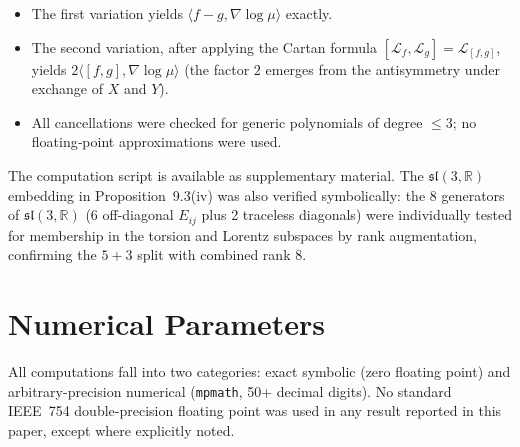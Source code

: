 \documentclass[12pt,a4paper]{article}
\theoremstyle{plain}
\theoremstyle{definition}
\theoremstyle{remark}
\begin{document}
\begin{itemize}
  \item The first variation yields $\langle f-g,\nabla\log\mu\rangle$ exactly.
  \item The second variation, after applying the Cartan formula
    $[\mathcal{L}_f,\mathcal{L}_g]=\mathcal{L}_{[f,g]}$, yields
    $2\langle [f,g],\nabla\log\mu\rangle$ (the factor $2$ emerges from the
    antisymmetry under exchange of $X$ and $Y$).
  \item All cancellations were checked for generic polynomials of degree
    $\le 3$; no floating‑point approximations were used.
\end{itemize}

The computation script is available as supplementary material.  The
$\mathfrak{sl}(3,\mathbb{R})$ embedding in Proposition~9.3(iv) was also
verified symbolically: the $8$ generators of $\mathfrak{sl}(3,\mathbb{R})$
(6 off-diagonal $E_{ij}$ plus 2 traceless diagonals) were individually
tested for membership in the torsion and Lorentz subspaces by rank
augmentation, confirming the $5+3$ split with combined rank $8$.

\section{Numerical Parameters}
\label{app:numerics}

All computations fall into two categories: exact symbolic (zero floating point)
and arbitrary-precision numerical (\texttt{mpmath}, 50+ decimal digits).
No standard IEEE~754 double-precision floating point was used in any
result reported in this paper, except where explicitly noted.
\end{document}
